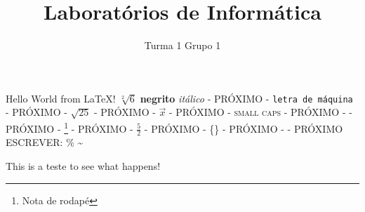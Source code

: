 \documentclass[12pt,openright,twoside]{report}
\title{\textbf{Laboratórios de Informática}}
\author{Turma 1 Grupo 1}
\date{}
\begin{document}
\maketitle
Hello World from \LaTeX! 
$\sqrt[2]{6}$
\textbf{negrito}
\textit{itálico} - PRÓXIMO - \texttt{letra de máquina} - PRÓXIMO - $\sqrt{25}$ - PRÓXIMO - $\vec{x}$  - PRÓXIMO - \textsc{small caps} - PRÓXIMO -  - PRÓXIMO - \footnote{Nota de rodapé} - PRÓXIMO - $\frac{5}{2}$ - PRÓXIMO - \{\} - PRÓXIMO - %
- PRÓXIMO ESCREVER: \% 
\textasciitilde 


This is a teste to see what happens!
\end{document}
